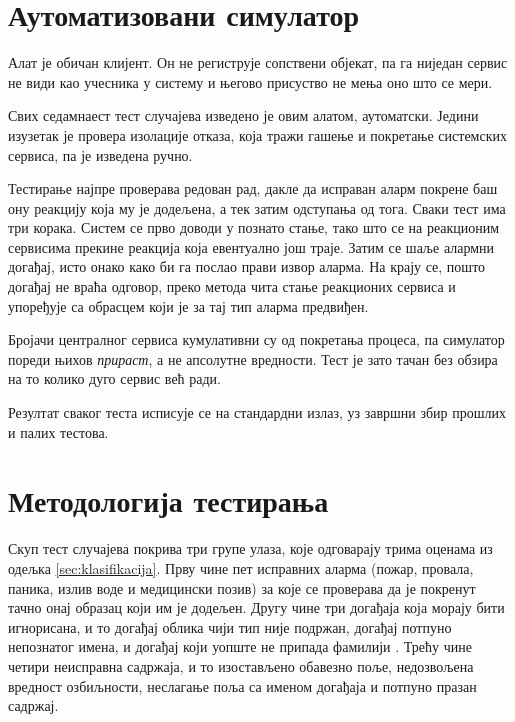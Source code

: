 \documentclass[12pt,oneside]{memoir}
\begin{document}
\section{Аутоматизовани симулатор}
\label{sec:simulator}

Алат  је обичан  клијент. Он не региструје сопствени
објекат, па га ниједан сервис не види као учесника у систему и његово присуство не мења оно
што се мери.

Свих седамнаест тест случајева изведено је овим алатом, аутоматски. 
Једини изузетак је провера изолације отказа, која тражи гашење и покретање системских 
сервиса, па је изведена ручно.

Тестирање најпре проверава редован рад, дакле да исправан аларм покрене баш ону реакцију која му је додељена, а тек затим одступања од тога.
Сваки тест има три корака. Систем се прво доводи у познато стање, тако што се на реакционим сервисима прекине реакција која евентуално још траје. 
Затим се шаље алармни догађај, исто онако како би га послао прави
извор аларма. На крају се, пошто догађај не враћа одговор, преко метода  чита
стање реакционих сервиса и упоређује са обрасцем који је за тај тип аларма предвиђен.

Бројачи централног сервиса кумулативни су од покретања процеса, па симулатор пореди њихов
\emph{прираст}, а не апсолутне вредности. Тест је зато тачан без обзира на то колико дуго
сервис већ ради.

Резултат сваког теста исписује се на стандардни излаз, уз завршни збир прошлих и палих
тестова.

\section{Методологија тестирања}
\label{sec:metodologija}

Скуп тест случајева покрива три групе улаза, које одговарају трима оценама из одељка
\ref{sec:klasifikacija}. Прву чине пет исправних аларма (пожар, провала, паника, излив воде
и медицински позив) за које се проверава да је покренут тачно онај образац који им је
додељен. Другу чине три догађаја која морају бити игнорисана, и то догађај облика 
чији тип није подржан, догађај потпуно непознатог имена, и догађај који уопште не припада
фамилији . Трећу чине четири неисправна садржаја, и то изостављено обавезно поље,
недозвољена вредност озбиљности, неслагање поља  са именом догађаја и потпуно
празан садржај.
\end{document}
